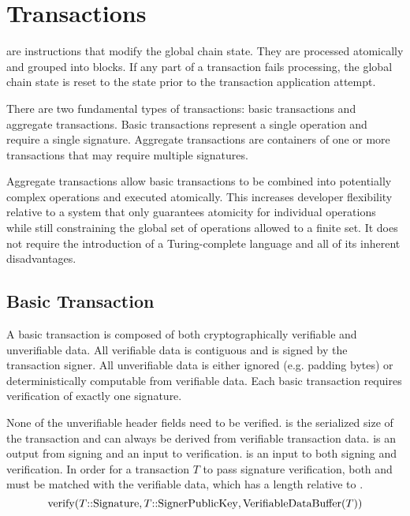 \section{Transactions}
\label{sec:transactions}


 are instructions that modify the global chain state.
They are processed atomically and grouped into blocks.
If any part of a transaction fails processing, the global chain state is reset to the state prior to the transaction application attempt.

There are two fundamental types of transactions: basic transactions and aggregate transactions.
Basic transactions represent a single operation and require a single signature.
Aggregate transactions are containers of one or more transactions that may require multiple signatures.

Aggregate transactions allow basic transactions to be combined into potentially complex operations and executed atomically.
This increases developer flexibility relative to a system that only guarantees atomicity for individual operations while still constraining the global set of operations allowed to a finite set.
It does not require the introduction of a Turing-complete language and all of its inherent disadvantages.

\subsection{Basic Transaction}

A basic transaction is composed of both cryptographically verifiable and unverifiable data.
All verifiable data is contiguous and is signed by the transaction signer.
All unverifiable data is either ignored (e.g. padding bytes) or deterministically computable from verifiable data.
Each basic transaction requires verification of exactly one signature.

None of the unverifiable header fields need to be verified.
 is the serialized size of the transaction and can always be derived from verifiable transaction data.
 is an output from signing and an input to verification.
 is an input to both signing and verification.
In order for a transaction $T$ to pass signature verification, both  and  must be matched with the verifiable data, which has a length relative to .
$$\mathrm{verify}(T\mathrm{{::}Signature}, T\mathrm{{::}SignerPublicKey}, \mathrm{VerifiableDataBuffer}(T))$$


